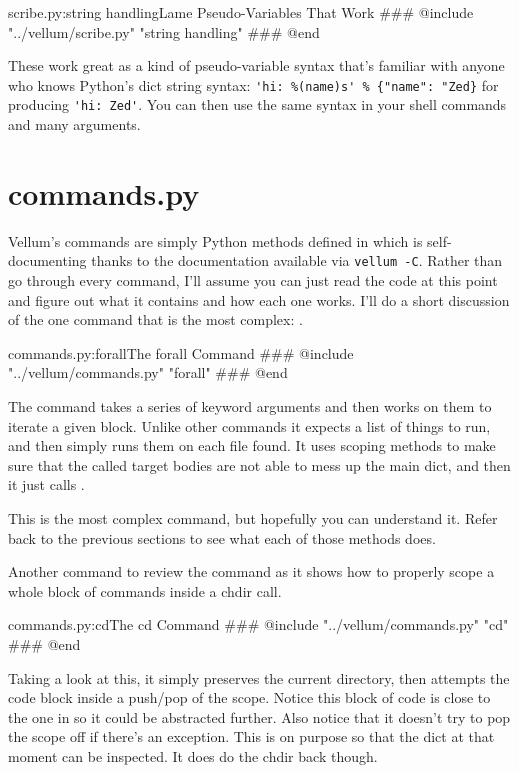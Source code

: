 \begin{code}{scribe.py:string handling}{Lame Pseudo-Variables That Work}
### @include "../vellum/scribe.py" "string handling"
### @end
\end{code}

These work great as a kind of pseudo-variable syntax that's familiar with anyone
who knows Python's dict string syntax:  \verb|'hi: %(name)s' % {"name": "Zed}|
for producing \verb|'hi: Zed'|.  You can then use the same syntax in your shell
commands and many arguments.


\section{commands.py}
\label{appendixA:commands}

Vellum's commands are simply Python methods defined in  which
is self-documenting thanks to the documentation available via \verb|vellum -C|.
Rather than go through every command, I'll assume you can just read the code at
this point and figure out what it contains and how each one works.  I'll do a
short discussion of the one command that is the most complex: .

\begin{code}{commands.py:forall}{The forall Command}
### @include "../vellum/commands.py" "forall"
### @end
\end{code}

The  command takes a series of keyword arguments and then works on
them to iterate a given block.  Unlike other commands it expects a list of
things to run, and then simply runs them on each file found.  It uses
 scoping methods to make sure that the called target bodies are
not able to mess up the main  dict, and then it just calls
.

This is the most complex command, but hopefully you can understand it.  Refer
back to the previous sections to see what each of those methods does.

Another command to review the  command as it shows how to properly
scope a whole block of commands inside a chdir call.


\begin{code}{commands.py:cd}{The cd Command}
### @include "../vellum/commands.py" "cd"
### @end
\end{code}

Taking a look at this, it simply preserves the current directory, then attempts
the code block inside a push/pop of the scope.  Notice this block of code is
close to the one in  so it could be abstracted further.  Also
notice that it doesn't try to pop the scope off if there's an exception.  This
is on purpose so that the  dict at that moment can be inspected.
It does do the chdir back though.


